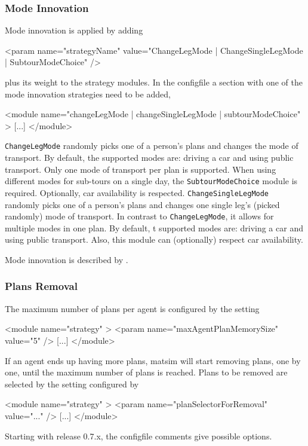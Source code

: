 \subsubsection{Mode Innovation}
\label{sec:modechoice}
Mode innovation is applied by adding 
%
\begin{xml}
	<param name="strategyName" value="{ChangeLegMode | ChangeSingleLegMode | SubtourModeChoice}" />
\end{xml}
%
plus its weight to the strategy modules. In the \gls{configfile} a section with one of the mode innovation strategies need to be added, \ie 
%
\begin{xml}
<module name="{changeLegMode | changeSingleLegMode | subtourModeChoice}" >
    [...]
</module>
\end{xml}
%
\lstinline|ChangeLegMode| randomly picks one of a person's  plans and changes the mode of transport. By default, the supported modes are: driving a car and using public transport. Only one mode of transport per plan is supported.  When using different modes for sub-tours on a single day, the \lstinline|SubtourModeChoice| module is required. Optionally, car availability is respected. \lstinline|ChangeSingleLegMode| randomly picks one of a person's plans and changes one single leg's (picked randomly) mode of transport. In contrast to \lstinline|ChangeLegMode|, it allows for multiple modes in one plan. By default, t supported modes are: driving a car and using public transport. Also, this module can (optionally) respect car availability.

Mode innovation is described by \citet[][]{RieserEtAl_TRR_2009, MeisterEtAl_WCTRS_2010, CiariEtAl_STRC_2008, CiariEtAl_STRC_2007}.

\subsubsection{Plans Removal}

The maximum number of plans per agent is configured by the setting 
\begin{xml}
<module name="strategy" >
   <param name="maxAgentPlanMemorySize" value="5" />
   [...]
</module>
\end{xml}
If an agent ends up having more plans, \gls{matsim} will start removing plans, one by one, until the maximum number of plans is reached.  Plans to be removed are selected by the setting configured by
\begin{xml}
<module name="strategy" >
   <param name="planSelectorForRemoval" value="..." />
   [...]
</module>
\end{xml}
Starting with release 0.7.x, the \gls{configfile} comments give possible options.

